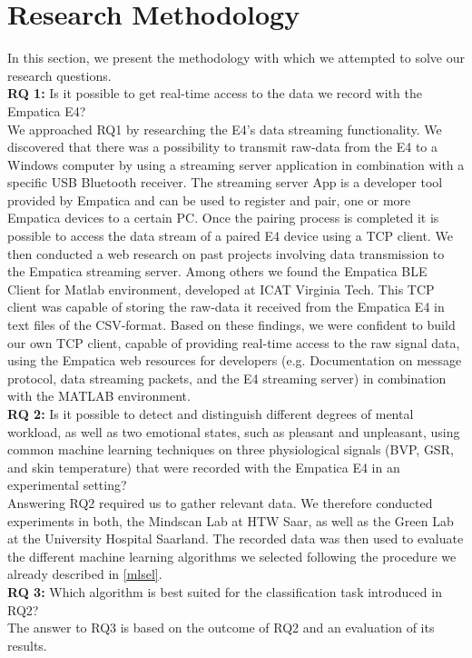 \section{Research Methodology}\label{meth}
In this section, we present the methodology with which we attempted to solve our research questions.\\[10pt]
\textbf{RQ 1:} Is it possible to get real-time access to the data we record with the Empatica E4?\\[10pt]
We approached RQ1 by researching the E4's data streaming functionality. We discovered that there was a possibility to transmit raw-data from the E4 to a Windows computer by using a streaming server application in combination with a specific USB Bluetooth receiver. The streaming server App is a developer tool provided by Empatica and can be used to register and pair, one or more Empatica devices to a certain PC. Once the pairing process is completed it is possible to access the data stream of a paired E4 device using a TCP client. We then conducted a web research on past projects involving data transmission to the Empatica streaming server. Among others we found the Empatica BLE Client for Matlab environment, developed at ICAT Virginia Tech. This TCP client was capable of storing the raw-data it received from the Empatica E4 in text files of the CSV-format. Based on these findings, we were confident to build our own TCP client, capable of providing real-time access to the raw signal data, using the Empatica web resources for developers (e.g. Documentation on message protocol, data streaming packets, and the E4 streaming server) in combination with the MATLAB environment. \\[10pt]
\textbf{RQ 2:} Is it possible to detect and distinguish different degrees of mental workload, as well as two emotional states, such as pleasant and unpleasant, using common machine learning techniques on three physiological signals (BVP, GSR, and skin temperature) that were recorded with the Empatica E4 in an experimental setting?\\[10pt]
Answering RQ2 required us to gather relevant data. We therefore conducted experiments in both, the Mindscan Lab at HTW Saar, as well as the Green Lab at the University Hospital Saarland. The recorded data was then used to evaluate the different machine learning algorithms we selected following the procedure we already described in \ref{mlsel}. \\[10pt]
\textbf{RQ 3:} Which algorithm is best suited for the classification task introduced in RQ2?\\[10pt]
The answer to RQ3 is based on the outcome of RQ2 and an evaluation of its results.
